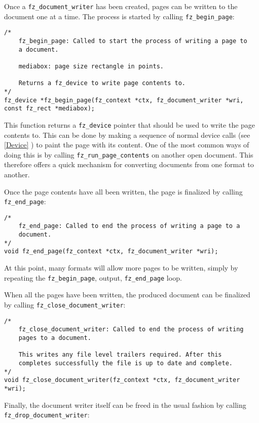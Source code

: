 \documentclass[oneside]{book}
\newcommand{\rjwref}[1] {\autoref{#1} \nameref{#1}}
\begin{document}
Once a \texttt{fz\_document\_writer} has been created, pages can be written to the document one at a time. The process is started by calling \texttt{fz\_begin\_page}:

\begin{lstlisting}
/*
	fz_begin_page: Called to start the process of writing a page to
	a document.

	mediabox: page size rectangle in points.

	Returns a fz_device to write page contents to.
*/
fz_device *fz_begin_page(fz_context *ctx, fz_document_writer *wri, const fz_rect *mediabox);
\end{lstlisting}

This function returns a \texttt{fz\_device} pointer that should be used to write the page contents to. This can be done by making a sequence of normal device calls (see \rjwref{Device}) to paint the page with its content. One of the most common ways of doing this is by calling \texttt{fz\_run\_page\_contents} on another open document. This therefore offers a quick mechanism for converting documents from one format to another.

Once the page contents have all been written, the page is finalized by calling \texttt{fz\_end\_page}:

\begin{lstlisting}
/*
	fz_end_page: Called to end the process of writing a page to a
	document.
*/
void fz_end_page(fz_context *ctx, fz_document_writer *wri);
\end{lstlisting}

At this point, many formats will allow more pages to be written, simply by repeating the \texttt{fz\_begin\_page}, output, \texttt{fz\_end\_page} loop.

When all the pages have been written, the produced document can be finalized by calling \texttt{fz\_close\_document\_writer}:

\begin{lstlisting}
/*
	fz_close_document_writer: Called to end the process of writing
	pages to a document.

	This writes any file level trailers required. After this
	completes successfully the file is up to date and complete.
*/
void fz_close_document_writer(fz_context *ctx, fz_document_writer *wri);
\end{lstlisting}

Finally, the document writer itself can be freed in the usual fashion by calling \texttt{fz\_drop\_document\_writer}:
\end{document}
